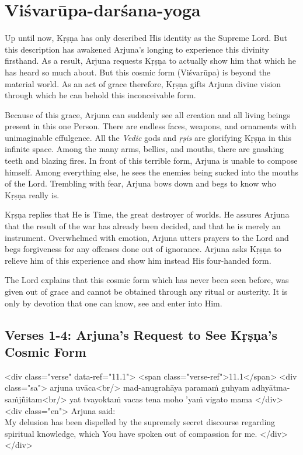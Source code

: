 \chapter{Viśvarūpa-darśana-yoga}\label{chap-visvarupa-darsana-yoga}

\noindent Up until now, Kṛṣṇa has only described His identity as the Supreme Lord. But this description has awakened Arjuna’s longing to experience this divinity firsthand. As a result, Arjuna requests Kṛṣṇa to actually show him that which he has heard so much about. But this cosmic form (Viśvarūpa) is beyond the material world. As an act of grace therefore, Kṛṣṇa gifts Arjuna divine vision through which he can behold this inconceivable form.

Because of this grace, Arjuna can suddenly see all creation and all living beings present in this one Person. There are endless faces, weapons, and ornaments with unimaginable effulgence. All the \textit{Vedic} gods and \textit{ṛṣis} are glorifying Kṛṣṇa in this infinite space. Among the many arms, bellies, and mouths, there are gnashing teeth and blazing fires. In front of this terrible form, Arjuna is unable to compose himself. Among everything else, he sees the enemies being sucked into the mouths of the Lord. Trembling with fear, Arjuna bows down and begs to know who Kṛṣṇa really is.

Kṛṣṇa replies that He is Time, the great destroyer of worlds. He assures Arjuna that the result of the war has already been decided, and that he is merely an instrument. Overwhelmed with emotion, Arjuna utters prayers to the Lord and begs forgiveness for any offenses done out of ignorance. Arjuna asks Kṛṣṇa to relieve him of this experience and show him instead His four-handed form.

The Lord explains that this cosmic form which has never been seen before, was given out of grace and cannot be obtained through any ritual or austerity. It is only by devotion that one can know, see and enter into Him.


\section{Verses 1-4: Arjuna's Request to See Kṛṣṇa's Cosmic Form}\label{sec-verses-1-4-arjuna-s-request-to-see-krsna-s-cosmic-form}

\begin{html}
<div class="verse" data-ref="11.1">
  <span class="verse-ref">11.1</span>
  <div class="sa">
    arjuna uvāca<br/>
    mad-anugrahāya paramaṁ guhyam adhyātma-saṁjñitam<br/>
    yat tvayoktaṁ vacas tena moho ’yaṁ vigato mama
  </div>
  <div class="en">
    \hspace*{1em}Arjuna said: \\ My delusion has been dispelled by the supremely secret discourse regarding spiritual knowledge, which You have spoken out of compassion for me.
  </div>
</div>
\end{html}



